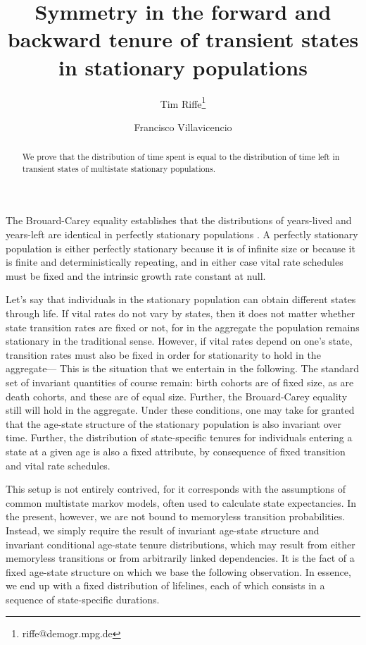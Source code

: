 \documentclass[12pt,oneside,a4paper]{article} %
\theoremstyle{definition}
\begin{document}
\title{Symmetry in the forward and backward tenure of transient states in
stationary populations}
\author[1]{Tim Riffe\thanks{riffe@demogr.mpg.de}}
\author[2,3]{Francisco Villavicencio}

\maketitle

\begin{abstract}
We prove that the distribution of time spent is equal to the distribution of
time left in transient states of multistate stationary populations.
\end{abstract}

The Brouard-Carey equality establishes that the distributions of years-lived and years-left are identical in perfectly
stationary populations
\citep{brouard1989mouvements,Vaupel2009,rao2014,villavicencioRiffeSymmetires2016}.
A perfectly stationary population is either perfectly stationary because it is
of infinite size or because it is finite and deterministically repeating, and in
either case vital rate schedules must be fixed and the intrinsic growth rate
constant at null.

Let's say that individuals in
the stationary population can obtain different states through life. If vital
rates do not vary by states, then it does not matter whether state
transition rates are fixed or not, for in the aggregate the population remains
stationary in the traditional sense. However, if vital rates depend on one's
state, transition rates must also be fixed in order for stationarity to
hold in the aggregate--- This is the situation that we entertain in the
following. The standard set of invariant quantities of course remain: birth cohorts are of
fixed size, as are death cohorts, and these are of equal size. Further, the
Brouard-Carey equality still will hold in the aggregate. Under these
conditions, one may take for granted that the age-state structure of the
stationary population is also invariant over time. Further, the distribution of
state-specific tenures for individuals entering a state at a given age is also a
fixed attribute, by consequence of fixed transition and vital rate schedules.

This setup is not entirely contrived, for it corresponds with the assumptions of
common multistate markov models, often used to calculate state expectancies. In
the present, however, we are not bound to memoryless transition probabilities.
Instead, we simply require the result of invariant age-state structure and
invariant conditional age-state tenure distributions, which may result from
either memoryless transitions or from arbitrarily linked dependencies. It is the
fact of a fixed age-state structure on which we base the following observation.
In essence, we end up with a fixed distribution of lifelines, each of which
consists in a sequence of state-specific durations. 
\end{document}
